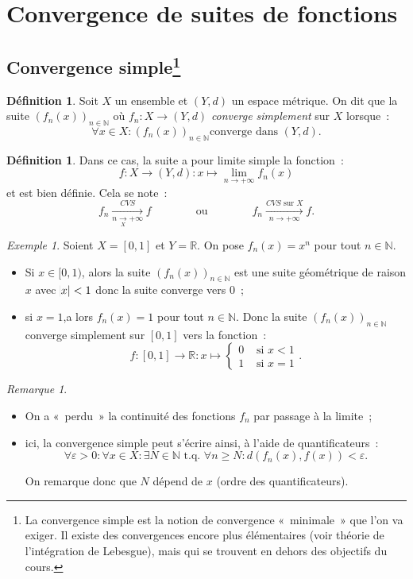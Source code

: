 \documentclass{report}
\theoremstyle{definition}
\newtheorem{déf}[thm]{Définition}
\theoremstyle{remark}
\newtheorem*{rmq}{Remarque}
\newtheorem{ex}{Exemple}[chapter]
\newcommand{\R}{\mathbb R}
\newcommand{\N}{\mathbb N}
\newcommand{\tq}{\text{ t.q. }}
\newcommand{\seqf}[4]{\left(#1_{#2}\left(#3\right)\right)_{#2 \in #4}}
\newcommand{\CONV}[5]{\xrightarrow[#2 \to #3]{#4 \text{ #5 } #1}}
\newcommand{\CVS}[3]{\CONV{#1}{#2}{#3}{CVS}{sur}}
\newcommand{\pinfty}{{+\infty}}
\begin{document}
	\section{Convergence de suites de fonctions}
		\subsection[Convergence simple]{Convergence simple\protect\footnote{La convergence simple est la notion de convergence «~minimale~» que l'on va exiger.
		Il existe des convergences encore plus élémentaires (voir théorie de l'intégration de Lebesgue), mais qui se trouvent en dehors des objectifs du cours.}}
			\begin{déf} Soit $X$ un ensemble et $(Y, d)$ un espace métrique. On dit que la suite $\seqf fnx\N$ où $f_n : X \to (Y, d)$
			\textit{converge simplement} sur $X$ lorsque~:
			\[\forall x \in X : \seqf fnx\N \text{converge dans } (Y, d).\]
			\end{déf}

			\begin{déf} Dans ce cas, la suite a pour limite simple la fonction~:
			\[f : X \to (Y, d) : x \mapsto \lim_{n \to \pinfty}f_n(x)\]
			et est bien définie. Cela se note~:
			\[f_n \xrightarrow[n \underset{X}{\to} \pinfty]{CVS} f \qquad\qquad \text{ou} \qquad\qquad f_n \CVS Xn\pinfty f.\]
			\end{déf}

			\begin{ex} Soient $X = [0, 1]$ et $Y = \R$. On pose $f_n(x) = x^n$ pour tout $n \in \N$.
			\begin{itemize}
				\item Si $x \in [0, 1)$, alors la suite $\seqf fnx\N$ est une suite géométrique de raison $x$ avec $\abs x < 1$ donc la suite converge vers 0~;
				\item si $x = 1$,a lors $f_n(x) = 1$ pour tout $n \in \N$. Donc la suite $\seqf fnx\N$ converge simplement sur $[0, 1]$ vers la fonction~:
				      \[f : [0, 1] \to \R : x \mapsto \begin{cases}0 &\text{ si } x  < 1 \\ 1 &\text{ si } x = 1\end{cases}.\]
			\end{itemize}
			\end{ex}

			\begin{rmq}~
			\begin{itemize}
				\item On a «~perdu~» la continuité des fonctions $f_n$ par passage à la limite~;
				\item ici, la convergence simple peut s'écrire ainsi, à l'aide de quantificateurs~:
				      \[\forall \varepsilon > 0 : \forall x \in X : \exists N \in \N \tq \forall n \geq N : d(f_n(x), f(x)) < \varepsilon.\]

				      On remarque donc que $N$ dépend de $x$ (ordre des quantificateurs).
			\end{itemize}
			\end{rmq}
\end{document}
